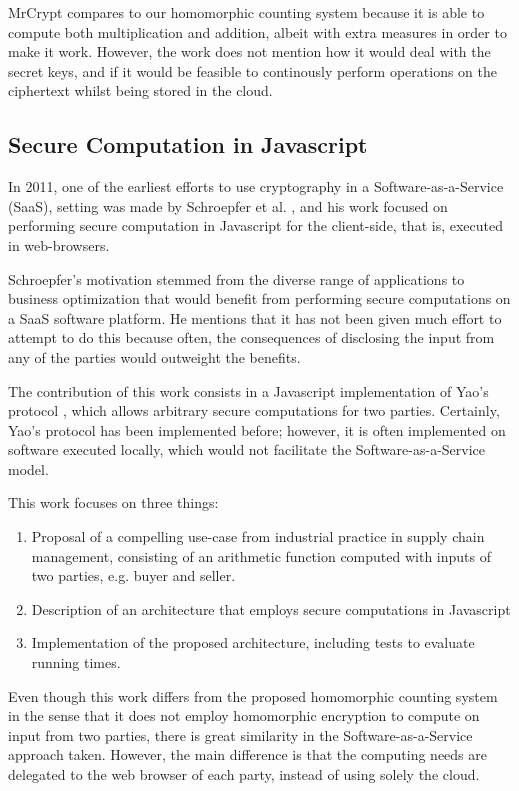 MrCrypt compares to our homomorphic counting system because it is able to compute both multiplication and addition, albeit with extra measures in order to make it work. However, the work does not mention how it would deal with the secret keys, and if it would be feasible to continously perform operations on the ciphertext whilst being stored in the cloud.

\subsection{Secure Computation in Javascript}

In 2011, one of the earliest efforts to use cryptography in a Software-as-a-Service (SaaS), setting was made by Schroepfer et al. \cite{Schroepfer:2011:DSC:2046707.2093509}, and his work focused on performing secure computation in Javascript for the client-side, that is, executed in web-browsers.

Schroepfer's motivation stemmed from the diverse range of applications to business optimization that would benefit from performing secure computations on a SaaS software platform. He mentions that it has not been given much effort to attempt to do this because often, the consequences of disclosing the input from any of the parties would outweight the benefits.

The contribution of this work consists in a Javascript implementation of Yao's protocol \cite{Yao:1986:GES:1382439.1382944}, which allows arbitrary secure computations for two parties. Certainly, Yao's protocol has been implemented before; however, it is often implemented on software executed locally, which would not facilitate the Software-as-a-Service model.

This work focuses on three things:
\begin{enumerate}
\item Proposal of a compelling use-case from industrial practice in supply chain management, consisting of an arithmetic function computed with inputs of two parties, e.g. buyer and seller.
\item Description of an architecture that employs secure computations in Javascript
\item Implementation of the proposed architecture, including tests to evaluate running times.
\end{enumerate}
   
Even though this work differs from the proposed homomorphic counting system in the sense that it does not employ homomorphic encryption to compute on input from two parties, there is great similarity in the Software-as-a-Service approach taken. However, the main difference is that the computing needs are delegated to the web browser of each party, instead of using solely the cloud.

